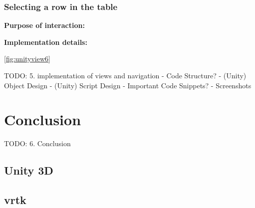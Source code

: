 \subsubsection{Selecting a row in the table}

\textbf{Purpose of interaction:}

\textbf{Implementation details:}

\ref{fig:unityview6}




TODO:
5. implementation of views and navigation
- Code Structure?
- (Unity) Object Design
- (Unity) Script Design
- Important Code Snippets?
- Screenshots







\section{Conclusion}


TODO:
6. Conclusion


\subsection{Unity 3D}


\subsection{\gls{vrtk}}




